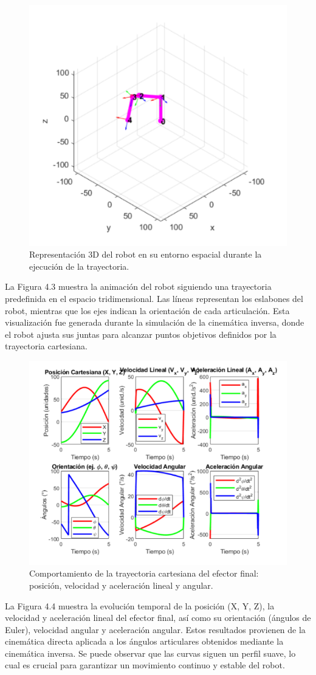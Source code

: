 \begin{figure}[H]
	\centering
	\includegraphics[width=0.7\linewidth]{img/inversa1}
	\caption{Representación 3D del robot en su entorno espacial durante la ejecución de la trayectoria.}
	\label{fig:inversa1}
\end{figure}
La Figura 4.3 muestra la animación del robot siguiendo una trayectoria predefinida en el espacio tridimensional. Las líneas representan los eslabones del robot, mientras que los ejes indican la orientación de cada articulación. Esta visualización fue generada durante la simulación de la cinemática inversa, donde el robot ajusta sus juntas para alcanzar puntos objetivos definidos por la trayectoria cartesiana.


\begin{figure} [H]
	\centering
	\includegraphics[width=0.9\linewidth]{img/inversa2}
	\caption{Comportamiento de la trayectoria cartesiana del efector final: posición, velocidad y aceleración lineal y angular.}
	\label{fig:inversa2}
\end{figure}
La Figura 4.4 muestra la evolución temporal de la posición (X, Y, Z), la velocidad y aceleración lineal del efector final, así como su orientación (ángulos de Euler), velocidad angular y aceleración angular. Estos resultados provienen de la cinemática directa aplicada a los ángulos articulares obtenidos mediante la cinemática inversa. Se puede observar que las curvas siguen un perfil suave, lo cual es crucial para garantizar un movimiento continuo y estable del robot.



